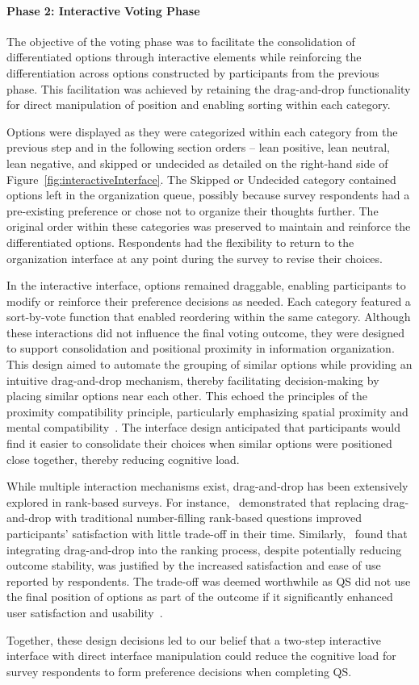 \paragraph{Phase 2: Interactive Voting Phase}

The objective of the voting phase was to facilitate the consolidation of differentiated options through interactive elements while reinforcing the differentiation across options constructed by participants from the previous phase. This facilitation was achieved by retaining the drag-and-drop functionality for direct manipulation of position and enabling sorting within each category.

Options were displayed as they were categorized within each category from the previous step and in the following section orders -- lean positive, lean neutral, lean negative, and skipped or undecided as detailed on the right-hand side of Figure~\ref{fig:interactiveInterface}. The Skipped or Undecided category contained options left in the organization queue, possibly because survey respondents had a pre-existing preference or chose not to organize their thoughts further. The original order within these categories was preserved to maintain and reinforce the differentiated options. Respondents had the flexibility to return to the organization interface at any point during the survey to revise their choices.

In the interactive interface, options remained draggable, enabling participants to modify or reinforce their preference decisions as needed. Each category featured a sort-by-vote function that enabled reordering within the same category. Although these interactions did not influence the final voting outcome, they were designed to support consolidation and positional proximity in information organization. This design aimed to automate the grouping of similar options while providing an intuitive drag-and-drop mechanism, thereby facilitating decision-making by placing similar options near each other. This echoed the principles of the proximity compatibility principle, particularly emphasizing spatial proximity and mental compatibility~\cite{wickens1990proximity}. The interface design anticipated that participants would find it easier to consolidate their choices when similar options were positioned close together, thereby reducing cognitive load.

While multiple interaction mechanisms exist, drag-and-drop has been extensively explored in rank-based surveys. For instance,~\textcite{krosnick2018measurement} demonstrated that replacing drag-and-drop with traditional number-filling rank-based questions improved participants' satisfaction with little trade-off in their time. Similarly,~\textcite{timbrook2013comparison} found that integrating drag-and-drop into the ranking process, despite potentially reducing outcome stability, was justified by the increased satisfaction and ease of use reported by respondents. The trade-off was deemed worthwhile as QS did not use the final position of options as part of the outcome if it significantly enhanced user satisfaction and usability~\cite{rintoulVisualAnimatedResponse}.

Together, these design decisions led to our belief that a two-step interactive interface with direct interface manipulation could reduce the cognitive load for survey respondents to form preference decisions when completing QS.